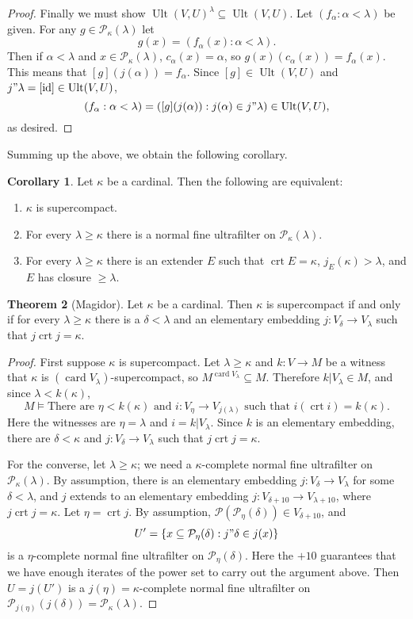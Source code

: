 \documentclass[12pt]{report}
\newcommand{\card}{\operatorname{card}}
\newcommand{\id}{\operatorname{id}}
\newcommand{\pset}{\mathcal{P}}
\DeclareMathOperator{\crt}{crt}
\DeclareMathOperator{\Ult}{Ult}
\theoremstyle{definition}
\newtheorem{theorem}{Theorem}[chapter]
\newtheorem{corollary}[theorem]{Corollary}
\begin{document}
\begin{proof}
Finally we must show $\Ult(V, U)^\lambda \subseteq \Ult(V, U)$. Let $(f_\alpha: \alpha < \lambda)$ be given.
For any $g \in \pset_\kappa(\lambda)$ let
$$g(x) = (f_\alpha(x): \alpha < \lambda).$$
Then if $\alpha < \lambda$ and $x \in \pset_\kappa(\lambda)$, $c_\alpha(x) = \alpha$, so $g(x)(c_\alpha(x)) = f_\alpha(x)$.
This means that $[g](j(\alpha)) = f_\alpha$. Since $[g] \in \Ult(V, U)$ and $j"\lambda = [\id] \in \Ult(V, U)$,
$$(f_\alpha: \alpha < \lambda) = ([g](j(\alpha)): j(\alpha) \in j"\lambda) \in \Ult(V, U),$$
as desired.
\end{proof}

Summing up the above, we obtain the following corollary.
\begin{corollary}
Let $\kappa$ be a cardinal. Then the following are equivalent:
\begin{enumerate}
\item $\kappa$ is supercompact.
\item For every $\lambda \geq \kappa$ there is a normal fine ultrafilter on $\pset_\kappa(\lambda)$.
\item For every $\lambda \geq \kappa$ there is an extender $E$ such that $\crt E = \kappa$, $j_E(\kappa) > \lambda$, and $E$ has closure $\geq \lambda$.
\end{enumerate}
\end{corollary}

\begin{theorem}[Magidor]
Let $\kappa$ be a cardinal. Then $\kappa$ is supercompact if and only if for every $\lambda \geq \kappa$ there is a $\delta < \lambda$ and an elementary embedding $j: V_\delta \to V_\lambda$ such that $j \crt j = \kappa$.
\end{theorem}
\begin{proof}
First suppose $\kappa$ is supercompact. Let $\lambda \geq \kappa$ and $k: V \to M$ be a witness that $\kappa$ is $(\card V_\lambda)$-supercompact, so $M^{\card V_\lambda} \subseteq M$.
Therefore $k|V_\lambda \in M$, and since $\lambda < k(\kappa)$,
$$M \models \text{There are $\eta < k(\kappa)$ and $i: V_{\eta} \to V_{j(\lambda)}$ such that $i(\crt i) = k(\kappa)$.}$$
Here the witnesses are $\eta = \lambda$ and $i = k|V_\lambda$.
Since $k$ is an elementary embedding, there are $\delta < \kappa$ and $j: V_\delta \to V_\lambda$ such that $j \crt j = \kappa$.

For the converse, let $\lambda \geq \kappa$; we need a $\kappa$-complete normal fine ultrafilter on $\pset_\kappa(\lambda)$.
By assumption, there is an elementary embedding $j: V_\delta \to V_\lambda$ for some $\delta < \lambda$, and $j$ extends to an elementary embedding $j: V_{\delta + 10} \to V_{\lambda + 10}$, where $j \crt j = \kappa$.
Let $\eta = \crt j$. By assumption, $\pset(\pset_\eta(\delta)) \in V_{\delta + 10}$, and
$$U' = \{x \subseteq \pset_\eta(\delta): j"\delta \in j(x)\}$$
is a $\eta$-complete normal fine ultrafilter on $\pset_\eta(\delta)$. Here the $+10$ guarantees that we have enough iterates of the power set to carry out the argument above.
Then $U = j(U')$ is a $j(\eta) = \kappa$-complete normal fine ultrafilter on $\pset_{j(\eta)}(j(\delta)) = \pset_\kappa(\lambda)$.
\end{proof}
\end{document}

